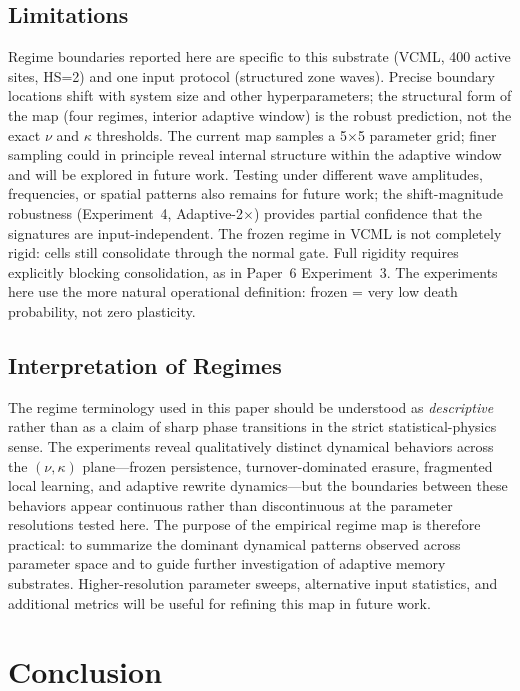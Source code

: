 \documentclass[11pt]{article}
\theoremstyle{remark}
\begin{document}
\subsection{Limitations}

Regime boundaries reported here are specific to this substrate (VCML, 400 active
sites, HS=2) and one input protocol (structured zone waves). Precise boundary
locations shift with system size and other hyperparameters; the structural form
of the map (four regimes, interior adaptive window) is the robust prediction,
not the exact $\nu$ and $\kappa$ thresholds. The current map samples a
5$\times$5 parameter grid; finer sampling could in principle reveal internal
structure within the adaptive window and will be explored in future work.
Testing under different wave amplitudes, frequencies, or spatial patterns also remains for future work; the
shift-magnitude robustness (Experiment~4, Adaptive-2$\times$) provides partial
confidence that the signatures are input-independent. The frozen regime in VCML
is not completely rigid: cells still consolidate through the normal gate. Full
rigidity requires explicitly blocking consolidation, as in Paper~6
Experiment~3. The experiments here use the more natural operational definition:
frozen = very low death probability, not zero plasticity.

\subsection{Interpretation of Regimes}

The regime terminology used in this paper should be understood as
\emph{descriptive} rather than as a claim of sharp phase transitions in the
strict statistical-physics sense. The experiments reveal qualitatively distinct
dynamical behaviors across the $(\nu, \kappa)$ plane---frozen persistence,
turnover-dominated erasure, fragmented local learning, and adaptive rewrite
dynamics---but the boundaries between these behaviors appear continuous rather
than discontinuous at the parameter resolutions tested here. The purpose of the
empirical regime map is therefore practical: to summarize the dominant dynamical
patterns observed across parameter space and to guide further investigation of
adaptive memory substrates. Higher-resolution parameter sweeps, alternative
input statistics, and additional metrics will be useful for refining this map in
future work.

\section{Conclusion}
\end{document}
